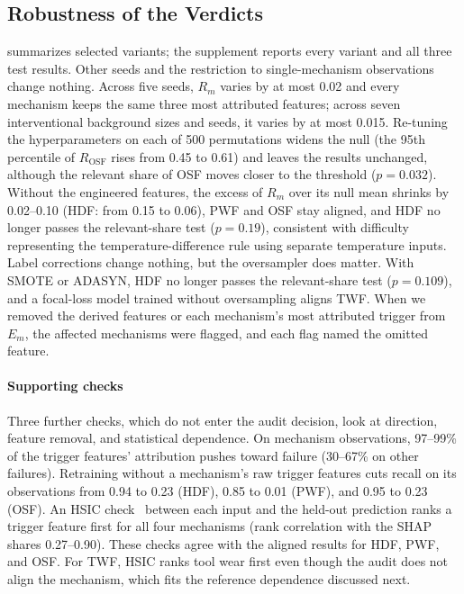 \documentclass[conference]{IEEEtran}
\begin{document}
\subsection{Robustness of the Verdicts}
\label{sec:robust}

\begin{table}[t]
\centering
\caption{Verdicts for selected audit variants: \checkmark~aligned,
$\times$~not aligned, \textbf{!}~flagged. All variants and full Holm-adjusted $p$-values are in the supplement.}
\label{tab:robust}
\footnotesize
\setlength{\tabcolsep}{4pt}

\end{table}

 summarizes selected variants; the supplement reports every variant and all three test results. Other seeds and the restriction to single-mechanism observations change nothing. Across five seeds, $R_m$ varies by at most 0.02 and every mechanism keeps the same three most attributed features; across seven interventional background sizes and seeds, it varies by at most 0.015. Re-tuning the hyperparameters on each of 500 permutations widens the null (the 95th percentile of $R_{\mathrm{OSF}}$ rises from 0.45 to 0.61) and leaves the results unchanged, although the relevant share of OSF moves closer to the threshold ($p=0.032$). Without the engineered features, the excess of $R_m$ over its null mean shrinks by 0.02--0.10 (HDF: from 0.15 to 0.06), PWF and OSF stay aligned, and HDF no longer passes the relevant-share test ($p=0.19$), consistent with difficulty representing the temperature-difference rule using separate temperature inputs. Label corrections change nothing, but the oversampler does matter. With SMOTE or ADASYN, HDF no longer passes the relevant-share test ($p=0.109$), and a focal-loss model trained without oversampling aligns TWF. When we removed the derived features or each mechanism's most attributed trigger from $E_m$, the affected mechanisms were flagged, and each flag named the omitted feature.

\paragraph{Supporting checks} Three further checks, which do not enter the audit decision, look at direction, feature removal, and statistical dependence. On mechanism observations, 97--99\% of the trigger features' attribution pushes toward failure (30--67\% on other failures). Retraining without a mechanism's raw trigger features cuts recall on its observations from 0.94 to 0.23 (HDF), 0.85 to 0.01 (PWF), and 0.95 to 0.23 (OSF). An HSIC check~\cite{daveiga2015global} between each input and the held-out prediction ranks a trigger feature first for all four mechanisms (rank correlation with the SHAP shares 0.27--0.90). These checks agree with the aligned results for HDF, PWF, and OSF. For TWF, HSIC ranks tool wear first even though the audit does not align the mechanism, which fits the reference dependence discussed next.
\end{document}
